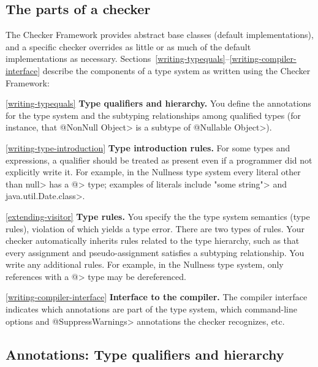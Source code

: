 \subsection{The parts of a checker}

The Checker Framework provides abstract base classes (default
implementations), and a specific checker overrides as little or as much of
the default implementations as necessary.
%
Sections~\ref{writing-typequals}--\ref{writing-compiler-interface} describe
the components of a type system as written using the Checker Framework:

\begin{description}

\item{\ref{writing-typequals}}
  \textbf{Type qualifiers and hierarchy.}  You define the annotations for
  the type system and the subtyping relationships among qualified types
  (for instance, that \<@NonNull Object> is a subtype of \<@Nullable
  Object>).

\item{\ref{writing-type-introduction}}
  \textbf{Type introduction rules.}  For some types and
  expressions, a qualifier should be treated as present even if a
  programmer did not explicitly write it.  For example, in the Nullness
  type system every literal
  other than \<null> has a \<@> type; examples of literals include \<"some
  string"> and \<java.util.Date.class>.

\item{\ref{extending-visitor}}
  \textbf{Type rules.}  You specify the the type system semantics (type
  rules), violation of which yields a type error.  There are two types of
  rules.  Your checker automatically inherits rules related to the type
  hierarchy, such as that every assignment and
  pseudo-assignment satisfies a subtyping relationship.  You write any
  additional rules.  For example, in the
  Nullness type system, only references with a \<@> type may be
  dereferenced.

\item{\ref{writing-compiler-interface}}
  \textbf{Interface to the compiler.}  The compiler interface indicates
  which annotations are part of the type system, which command-line options
  and \<@SuppressWarnings> annotations the checker recognizes, etc.
\end{description}


\subsection{Annotations: Type qualifiers and hierarchy\label{writing-typequals}}

